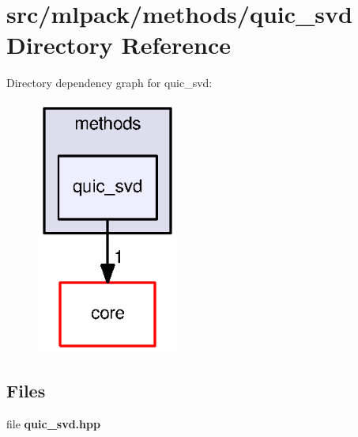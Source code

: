 \section{src/mlpack/methods/quic\+\_\+svd Directory Reference}
\label{dir_d5b6866e35aa9a05a7a312d572562d99}
Directory dependency graph for quic\+\_\+svd\+:
\nopagebreak
\begin{figure}[H]
\begin{center}
\leavevmode
\includegraphics[width=132pt]{dir_d5b6866e35aa9a05a7a312d572562d99_dep}
\end{center}
\end{figure}
\subsection*{Files}
\begin{DoxyCompactItemize}
\item 
file {\bf quic\+\_\+svd.\+hpp}
\end{DoxyCompactItemize}
